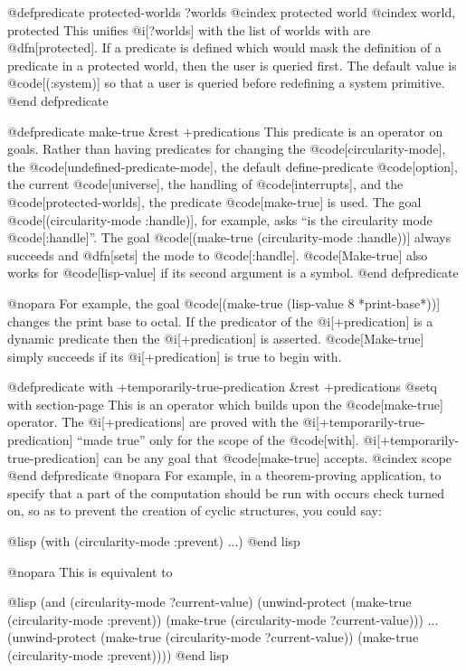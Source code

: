 {@defpredicate protected-worlds ?worlds
@cindex protected world
@cindex world, protected
This unifies @i[?worlds] with the list of worlds with are @dfn[protected].
If a predicate is defined which would mask the definition of a predicate in
a protected world, then the user is queried first.
The default value is @code[(:system)] so that a user is queried before
redefining a system primitive.
@end defpredicate

@defpredicate make-true &rest +predications
This predicate is an operator on goals.  Rather than having
predicates for changing the @code[circularity-mode], the
@code[undefined-predicate-mode], the default define-predicate @code[option],
the current @code[universe], the handling of @code[interrupts], 
and the @code[protected-worlds], the predicate
@code[make-true] is used.  The goal @code[(circularity-mode
:handle)], for example, asks ``is the circularity mode @code[:handle]''.
The goal @code[(make-true (circularity-mode :handle))] always
succeeds and @dfn[sets] the mode to @code[:handle].  @code[Make-true] also
works for @code[lisp-value] if its second argument is a symbol.
@end defpredicate

@nopara
For example, the goal @code[(make-true (lisp-value 8 *print-base*))]
changes the print base to octal.
If the predicator of the @i[+predication] is a dynamic predicate then the
@i[+predication] is asserted.
@code[Make-true] simply succeeds if its @i[+predication] is true to begin
with. 

@defpredicate with +temporarily-true-predication &rest +predications
@setq with section-page
This is an operator which builds upon the @code[make-true] operator.
The @i[+predications] are proved with the
@i[+temporarily-true-predication] ``made true'' only for the scope of
the @code[with].  @i[+temporarily-true-predication] can be any
goal that @code[make-true] accepts.
@cindex scope
@end defpredicate
@nopara
For example, in a theorem-proving application, to specify that a part of
the computation should be run with occurs check turned on, so as to prevent
the creation of cyclic structures, you could say:

@lisp
(with (circularity-mode :prevent) 
      ...)
@end lisp

@nopara
This is equivalent to

@lisp
(and (circularity-mode ?current-value)
     (unwind-protect (make-true (circularity-mode :prevent))
                     (make-true (circularity-mode ?current-value)))
     ...
     (unwind-protect (make-true (circularity-mode ?current-value))
                     (make-true (circularity-mode :prevent))))
@end lisp

}
